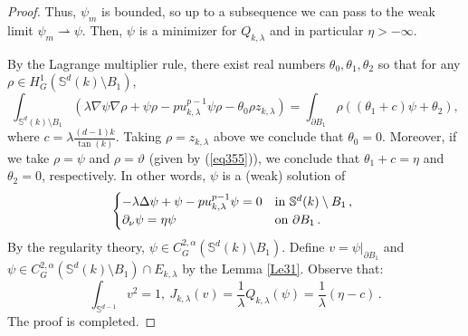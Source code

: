 \documentclass[reqno]{amsart}
\numberwithin{equation}{section}
\newenvironment{key words}{\textbf{Keywords}\mbox{  }}{ }
\begin{document}
\begin{proof}
Thus, $\psi_{m}$ is bounded, so up to a subsequence we can pass to the weak limit $\psi_{m}\rightharpoonup\psi.$ Then, $\psi$ is a minimizer for $Q_{k, \lambda}$  and in particular $\eta>-\infty.$

\medskip

By the Lagrange multiplier rule, there exist real numbers $\theta_{0},\theta_{1},\theta_{2}$  so that for any $\rho\in H_{G}^{1}(\mathbb{S}^{d}(k)\setminus B_{1})$,
\[\int_{\mathbb{S}^{d}(k)\setminus B_{1}}\left(\lambda\nabla\psi\nabla\rho+\psi\rho-pu_{k,\lambda}^{p-1}\psi\rho -\theta_{0} \rho z_{k,\lambda}\right)=\int_{\partial B_1}\rho((\theta_{1}+c)\psi+\theta_{2}),\]
where $c=\lambda\frac{(d-1)k}{\tan(k)}.$ Taking $\rho=z_{k,\lambda}$ above we conclude that $\theta_{0}=0$. Moreover, if we take $\rho=\psi$ and $\rho=\vartheta$ (given by (\ref{eq355})), we conclude that $\theta_{1}+c=\eta$ and $\theta_{2}=0$, respectively. In other words, $\psi$
 is a (weak) solution of
\begin{equation}\label{eq325}
  \begin{cases}
  -\lambda\Delta\psi+\psi-pu_{k,\lambda}^{p-1}\psi=0 &\mbox{in $\mathbb{S}^{d}(k)\setminus B_{1}$\,, }\\
  \partial_{\nu}\psi=\eta\psi &\mbox{on $\partial B_1$\,.}
  \end{cases}
\end{equation}
By the regularity theory, $\psi\in C^{2,\alpha}_{G}(\mathbb{S}^{d}(k)\setminus B_{1})$. Define $v = \psi|_{\partial B_1}$ and $\psi\in C^{2,\alpha}_{G}(\mathbb{S}^{d}(k)\setminus B_{1})\cap E_{k,\lambda}$ by the Lemma \ref{Le31}. Observe that:
$$
\int_{\mathbb{S}^{d-1}} v^2 = 1, \ J_{k,\lambda}(v)= \frac{1}{\lambda} Q_{k,\lambda}(\psi)= \frac{1}{\lambda} (\eta-c)\,.
$$
The proof is completed.
\end{proof}
\end{document}
